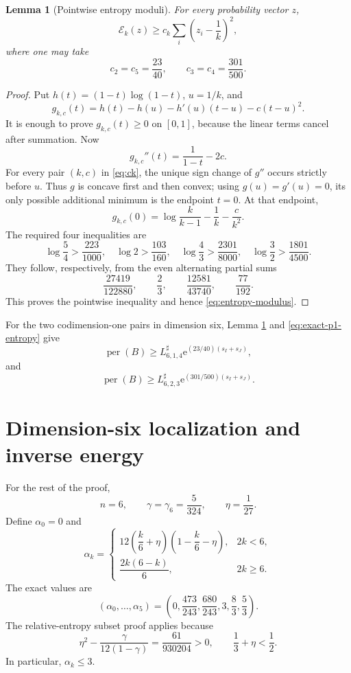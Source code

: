 \documentclass[11pt]{article}
\newtheorem{lemma}[theorem]{Lemma}
\theoremstyle{definition}
\newcommand{\per}{\operatorname{per}}
\newcommand{\e}{\mathrm e}
\begin{document}
\begin{lemma}[Pointwise entropy moduli]\label{lem:small-entropy-moduli}
For every probability vector $z$,
\[
 \mathcal E_k(z)\ge c_k
 \sum_i\left(z_i-\frac1k\right)^2,
 \tag{2.9}\label{eq:entropy-modulus}
\]
where one may take
\[
 c_2=c_5=\frac{23}{40},
 \qquad
 c_3=c_4=\frac{301}{500}.
 \tag{2.10}\label{eq:ck}
\]
\end{lemma}

\begin{proof}
Put $h(t)=(1-t)\log(1-t)$, $u=1/k$, and
\[
 g_{k,c}(t)=h(t)-h(u)-h'(u)(t-u)-c(t-u)^2.
\]
It is enough to prove $g_{k,c}(t)\ge0$ on $[0,1]$, because the linear terms
cancel after summation.  Now
\[
 g_{k,c}''(t)=\frac1{1-t}-2c.
\]
For every pair $(k,c)$ in \eqref{eq:ck}, the unique sign change of
$g''$ occurs strictly before $u$.  Thus $g$ is concave first and then convex;
using $g(u)=g'(u)=0$, its only possible additional minimum is the endpoint
$t=0$.  At that endpoint,
\[
 g_{k,c}(0)=\log\frac{k}{k-1}-\frac1k-\frac{c}{k^2}.
 \tag{2.11}\label{eq:g0}
\]
The required four inequalities are
\[
 \log\frac54>\frac{223}{1000},
 \quad
 \log2>\frac{103}{160},
 \quad
 \log\frac43>\frac{2301}{8000},
 \quad
 \log\frac32>\frac{1801}{4500}.
\]
They follow, respectively, from the even alternating partial sums
\[
 \frac{27419}{122880},
 \qquad \frac23,
 \qquad \frac{12581}{43740},
 \qquad \frac{77}{192}.
\]
This proves the pointwise inequality and hence \eqref{eq:entropy-modulus}.
\end{proof}

For the two codimension-one pairs in dimension six, Lemma
\ref{lem:small-entropy-moduli} and \eqref{eq:exact-p1-entropy} give
\[
 \per(B)\ge L^{\sharp}_{6,1,4}\e^{(23/40)(s_I+s_J)},
 \tag{2.12}\label{eq:lambda14}
\]
and
\[
 \per(B)\ge L^{\sharp}_{6,2,3}\e^{(301/500)(s_I+s_J)}.
 \tag{2.13}\label{eq:lambda23}
\]

\section{Dimension-six localization and inverse energy}

For the rest of the proof,
\[
 n=6,
 \qquad
 \gamma=\gamma_6=\frac5{324},
 \qquad
 \eta=\frac1{27}.
\]
Define $\alpha_0=0$ and
\[
 \alpha_k=
 \begin{cases}
 12\left(\dfrac{k}{6}+\eta\right)
       \left(1-\dfrac{k}{6}-\eta\right),&2k<6,\\[2mm]
 \dfrac{2k(6-k)}6,&2k\ge6.
 \end{cases}
 \tag{3.1}\label{eq:alpha6}
\]
The exact values are
\[
 (\alpha_0,\ldots,\alpha_5)
 =\left(0,\frac{473}{243},\frac{680}{243},3,\frac83,\frac53\right).
 \tag{3.2}\label{eq:alpha-values}
\]
The relative-entropy subset proof applies because
\[
 \eta^2-\frac{\gamma}{12(1-\gamma)}
 =\frac{61}{930204}>0,
 \qquad
 \frac13+\eta<\frac12.
 \tag{3.3}\label{eq:localization6}
\]
In particular, $\alpha_k\le3$.
\end{document}
